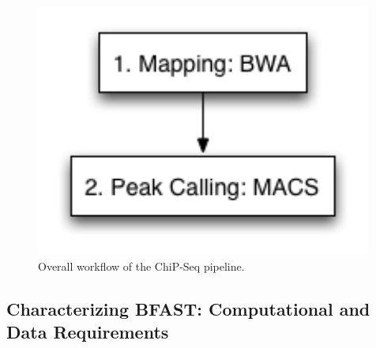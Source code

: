 \documentclass{cpeauth}
\begin{document}
\begin{figure}
 \centering


\includegraphics[bb=0 0 300 300, scale=0.39]{figures/chip-seq.pdf}

\caption{\small Overall workflow of the ChiP-Seq pipeline.}
  \label{fig:chip-seq} 
 \end{figure}



\subsection{Characterizing BFAST: Computational and Data Requirements}
\end{document}
